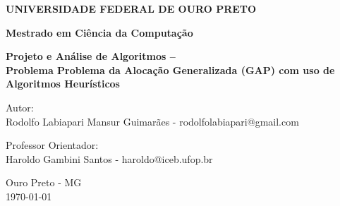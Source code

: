 \documentclass[portugues, brazil, a4paper,12pt]{article}
\begin{document}
\begin{titlepage}
  \vfill

  \begin{center}
    \begin{Large}
      \textbf{UNIVERSIDADE FEDERAL DE OURO PRETO}
    \end{Large}
  \end{center}

  \begin{center}
    \begin{large}
      \textbf{Mestrado em Ciência da Computação} \\[1.4cm] 
    \end{large}
  \end{center}

  \vfill

  \begin{center}
    \begin{large}
      \textbf{Projeto e Análise de Algoritmos -- \\ Problema Problema da Alocação Generalizada (GAP) com uso de Algoritmos Heurísticos} \\[0.4cm] 
    \end{large}
  \end{center}

  \vfill

  \begin{center}
    \begin{large}
      Autor: \\
		Rodolfo Labiapari Mansur Guimarães - rodolfolabiapari@gmail.com
    \end{large}
  \end{center}

	\vfill

  \begin{center}
    \begin{large}
      Professor Orientador: \\
      Haroldo Gambini Santos - haroldo@iceb.ufop.br
    \end{large}
  \end{center}

  \vfill

  \begin{center}
    \begin{large}
      Ouro Preto - MG \\
      \today \\
    \end{large}
  \end{center}

\clearpage
\tableofcontents 
\end{titlepage}
\end{document}

